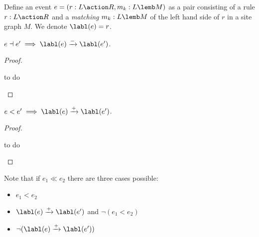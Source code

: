 \begin{definition}[Event]
  Define an event $e=(r:L\action R,m_k:L\lemb M)$ as a pair consisting of a rule $r:L\action R$ and a \emph{matching} $m_k:L\lemb M$ of the left hand side of $r$ in a site graph $M$. We denote $\labl(e) = r$.
\end{definition}

\begin{property}
  $e\dashv e' \implies\labl(e)\xrightarrow{-}\labl(e')$.
\end{property}
\begin{proof}
  \begin{mdframed}[backgroundcolor=blue!20]
    to do
  \end{mdframed}
\end{proof}

\begin{property}
\label{prop:cause_pos_infl}
  $e< e'\implies \labl(e)\xrightarrow{+}\labl(e')$.
\end{property}
\begin{proof}
  \begin{mdframed}[backgroundcolor=blue!20]
    to do
  \end{mdframed}
\end{proof}

Note that if $e_1\ll e_2$ there are three cases possible:
\begin{itemize}
\item $e_1< e_2$
\item $\labl(e)\xrightarrow{+}\labl(e')$ and $\neg(e_1 < e_2)$
\item $\neg(\labl(e)\xrightarrow{+}\labl(e'))$
\end{itemize}
